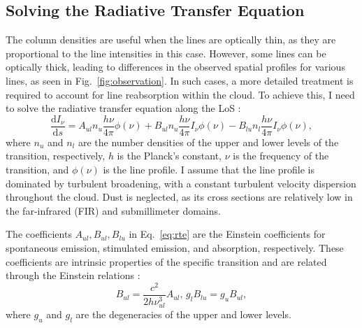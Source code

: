 \documentclass[12pt,a4paper]{article}
\newcommand{\fird}[2][]{\frac{\mathrm{d}#1}{\mathrm{d}#2}}
\begin{document}
\subsection{Solving the Radiative Transfer Equation} \label{sec:rte}
The column densities are useful when the lines are optically thin, as they are proportional to the line intensities in this case. However, some lines can be optically thick, leading to differences in the observed spatial profiles for various lines, as seen in Fig.~\ref{fig:observation}. In such cases, a more detailed treatment is required to account for line reabsorption within the cloud. To achieve this, I need to solve the radiative transfer equation along the LoS \parencite[see, e.g.,][ Eq.~1.67]{Rybicki1979}:
\begin{equation}
    \fird[I_\nu]{s} = A_{ul} n_u\frac{h\nu}{4\pi}\phi(\nu) +  B_{ul} n_u\frac{h\nu}{4\pi}I_\nu \phi(\nu) -  B_{lu} n_l\frac{h\nu}{4\pi}I_\nu \phi(\nu), \label{eq:rte}
\end{equation}  
where $n_u$ and $n_l$ are the number densities of the upper and lower levels of the transition, respectively, $h$ is the Planck's constant, $\nu$ is the frequency of the transition, and $\phi(\nu)$ is the line profile. I assume that the line profile is dominated by turbulent broadening, with a constant turbulent velocity dispersion throughout the cloud. Dust is neglected, as its cross sections are relatively low in the far-infrared (FIR) and submillimeter domains.


The coefficients $A_{ul}, B_{ul}, B_{lu}$ in Eq.~\ref{eq:rte} are the Einstein coefficients for spontaneous emission, stimulated emission, and absorption, respectively. These coefficients are intrinsic properties of the specific transition and are related through the Einstein relations \parencite{Einstein1917}:
\begin{equation}
    B_{ul} = \frac{c^2}{2 h \nu_{ul}^3} A_{ul},\, g_l B_{lu} = g_u B_{ul},
\end{equation}
where $g_u$ and $g_l$ are the degeneracies of the upper and lower levels.
\end{document}
